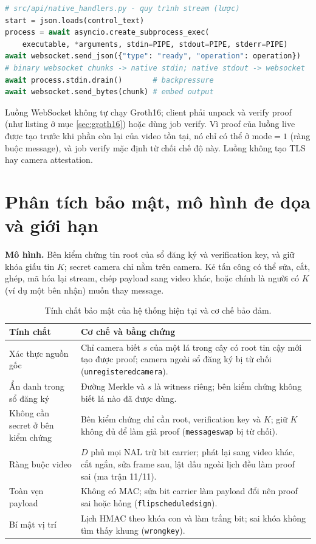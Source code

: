 \documentclass[11pt,a4paper]{article}
\renewcommand{\_}{\origunderscore\allowbreak}
\begin{document}
\begin{lstlisting}[language=Python]
# src/api/native_handlers.py - quy trình stream (lược)
start = json.loads(control_text)
process = await asyncio.create_subprocess_exec(
    executable, *arguments, stdin=PIPE, stdout=PIPE, stderr=PIPE)
await websocket.send_json({"type": "ready", "operation": operation})
# binary websocket chunks -> native stdin; native stdout -> websocket
await process.stdin.drain()       # backpressure
await websocket.send_bytes(chunk) # embed output
\end{lstlisting}
Luồng WebSocket không tự chạy Groth16; client phải unpack và verify proof (như listing ở mục \ref{sec:groth16}) hoặc dùng job verify. Vì proof của luồng live được tạo trước khi phần còn lại của video tồn tại, nó chỉ có thể ở $\mathrm{mode}=1$ (ràng buộc message), và job verify mặc định từ chối chế độ này. Luồng không tạo TLS hay camera attestation.

\section{Phân tích bảo mật, mô hình đe dọa và giới hạn}\label{sec:threats}
\textbf{Mô hình.} Bên kiểm chứng tin root của sổ đăng ký và verification key, và giữ khóa giấu tin $K$; secret camera chỉ nằm trên camera. Kẻ tấn công có thể sửa, cắt, ghép, mã hóa lại stream, chép payload sang video khác, hoặc chính là người có $K$ (ví dụ một bên nhận) muốn thay message.

\begin{table}[H]\centering\small
\caption{Tính chất bảo mật của hệ thống hiện tại và cơ chế bảo đảm.}
\begin{tabularx}{\textwidth}{p{4.0cm}X}\toprule
Tính chất & Cơ chế và bằng chứng\\\midrule
Xác thực nguồn gốc & Chỉ camera biết $s$ của một lá trong cây có root tin cậy mới tạo được proof; camera ngoài sổ đăng ký bị từ chối (\texttt{unregistered\_camera}).\\
Ẩn danh trong sổ đăng ký & Đường Merkle và $s$ là witness riêng; bên kiểm chứng không biết lá nào đã được dùng.\\
Không cần secret ở bên kiểm chứng & Bên kiểm chứng chỉ cần root, verification key và $K$; giữ $K$ không đủ để làm giả proof (\texttt{message\_swap} bị từ chối).\\
Ràng buộc video & $D$ phủ mọi NAL trừ bit carrier; phát lại sang video khác, cắt ngắn, sửa frame sau, lật dấu ngoài lịch đều làm proof sai (ma trận 11/11).\\
Toàn vẹn payload & Không có MAC; sửa bit carrier làm payload đổi nên proof sai hoặc hỏng (\texttt{flip\_scheduled\_sign}).\\
Bí mật vị trí & Lịch HMAC theo khóa con và làm trắng bit; sai khóa không tìm thấy khung (\texttt{wrong\_key}).\\
\bottomrule\end{tabularx}
\end{table}
\end{document}
